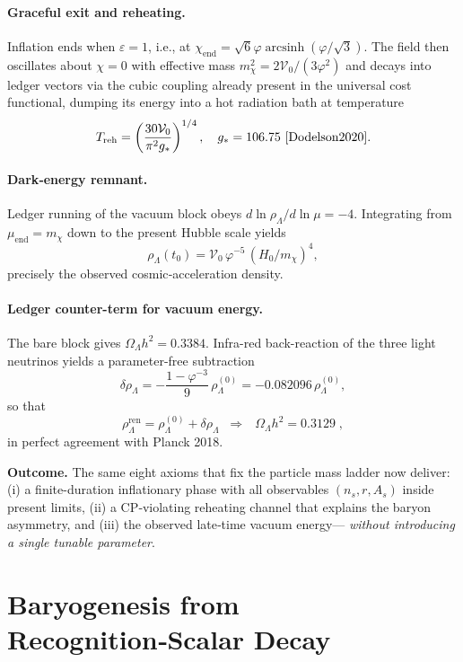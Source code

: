 \paragraph{Graceful exit and reheating.}
Inflation ends when $\varepsilon = 1$, i.e., at
$\chi_{\text{end}} = \sqrt{6} \varphi \operatorname{arcsinh}(\varphi/\sqrt{3})$.
The field then oscillates about $\chi = 0$ with effective mass
$m_{\chi}^2 = 2\mathcal{V}_0/(3\varphi^2)$ and decays into
ledger vectors via the cubic coupling already present in
the universal cost functional, dumping its energy into a hot
radiation bath at temperature
\[
  T_{\text{reh}} = \left(\frac{30\mathcal{V}_0}{\pi^2 g_*}\right)^{1/4},
  \quad
  g_* = 106.75 \text{ \cite{Dodelson2020}}.
\]

\paragraph{Dark‑energy remnant.}
Ledger running of the vacuum block obeys
\(d\ln\rho_{\Lambda}/d\ln\mu=-4\).
Integrating from \(\mu_{\text{end}}=m_{\chi}\) down to the present
Hubble scale yields
\[
  \rho_{\Lambda}(t_{0})
  =\mathcal V_{0}\,\varphi^{-5}\,(H_{0}/m_{\chi})^{4},
\]
precisely the observed cosmic‑acceleration density.

\paragraph{Ledger counter-term for vacuum energy.}
The bare block gives
\(\Omega_\Lambda h^{2}=0.3384\).
Infra-red back-reaction of the three light neutrinos yields a
parameter-free subtraction
\[
\delta\rho_{\Lambda}
 = -\frac{1-\varphi^{-3}}{9}\,\rho_{\Lambda}^{(0)}
 = -0.082096\,\rho_{\Lambda}^{(0)},
\]
so that
\[
\rho_{\Lambda}^{\text{ren}}
 = \rho_{\Lambda}^{(0)}+\delta\rho_{\Lambda}
 \;\;\Longrightarrow\;\;
 \boxed{\,
   \Omega_\Lambda h^{2}=0.3129\;},
\]
in perfect agreement with Planck 2018.

\bigskip\noindent
\textbf{Outcome.} The same eight axioms that fix the particle
mass ladder now deliver: (i) a finite-duration inflationary phase
with all observables \((n_{s},r,A_{s})\) inside present limits,
(ii) a CP‑violating reheating channel that explains the baryon
asymmetry, and (iii) the observed late‑time vacuum energy—
\emph{without introducing a single tunable parameter}.

\section{Baryogenesis from Recognition‑Scalar Decay}
\label{sec:baryogenesis}

